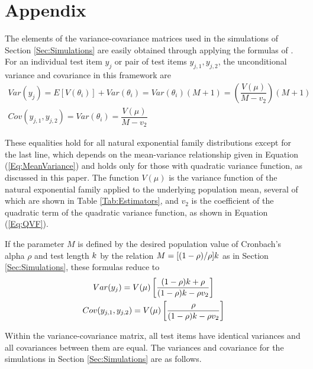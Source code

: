 \documentclass[12pt,epsfig]{article}
\newcommand{\changed}[1]{\textcolor{black}{#1}}
\newcommand{\testlength}{\changed{k}}%
\begin{document}
\clearpage

\appendix

\color{black}


\section*{Appendix}

The elements of the variance-covariance matrices used in the simulations of Section \ref{Sec:Simulations} are easily obtained through applying the formulas of \cite{Foster2020}. For an individual test item $y_j$ or pair of test items $y_{j,1}, y_{j,2}$, the unconditional variance and covariance in this framework are\\

\begin{gather*}
Var(y_j) = E[V(\theta_i)] + Var(\theta_i) = Var(\theta_i) (M + 1) = \left(\dfrac{V(\mu)}{M - v_2}\right) (M + 1)\\
Cov(y_{j,1}, y_{j,2}) = Var(\theta_i) = \dfrac{V(\mu)}{M - v_2} 
\end{gather*}

\noindent These equalities hold for all natural exponential family distributions except for the last line, which depends on the mean-variance relationship given in Equation (\ref{Eq:MeanVariance}) and holds only for those with quadratic variance function, as discussed in this paper. The function $V(\mu)$ is the variance function of the natural exponential family applied to the underlying population mean, several of which are shown in Table \ref{Tab:Estimators}, and $v_2$ is the coefficient of the quadratic term of the quadratic variance function, as shown in Equation (\ref{Eq:QVF}).


If the parameter $M$ is defined by the desired population value of Cronbach's alpha $\rho$ and test length $\testlength$ by the relation $M = [(1-\rho)/\rho]\testlength$ as in Section \ref{Sec:Simulations}, these formulas reduce to\\

\begin{gather*}
Var(y_j)  = V(\mu) \left[\dfrac{(1-\rho)\testlength + \rho}{(1-\rho)\testlength - \rho v_2}\right]\\
Cov(y_{j,1}, y_{j,2}) =  V(\mu) \left[\dfrac{\rho}{(1-\rho)\testlength - \rho v_2}\right]
\end{gather*}

\noindent Within the variance-covariance matrix, all test items have identical variances and all covariances between them are equal. The variances and covariance for the simulations in Section \ref{Sec:Simulations} are as follows.\\
\end{document}
